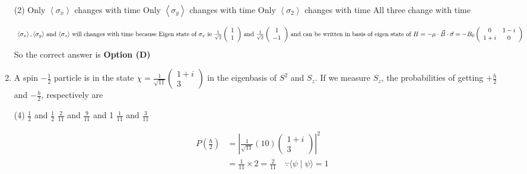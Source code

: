 \begin{enumerate}
{}
\begin{tasks}(2)
\task[\textbf{A.}] Only $\left\langle\sigma_{x}\right\rangle$ changes with time
\task[\textbf{B.}] Only $\left\langle\sigma_{y}\right\rangle$ changes with time
\task[\textbf{C.}] Only $\left\langle\sigma_{2}\right\rangle$ changes with time
\task[\textbf{D.}] All three change with time
\end{tasks}
\begin{answer}
\begin{align*}
\intertext{ $\left\langle\sigma_{x}\right\rangle,\left\langle\sigma_{y}\right\rangle$ and $\left\langle\sigma_{z}\right\rangle$ will changes with time because Eigen state of $\sigma_{x}$ ie $\frac{1}{\sqrt{2}}\left(\begin{array}{l}1 \\ 1\end{array}\right)$ and $\frac{1}{\sqrt{2}}\left(\begin{array}{c}1 \\ -1\end{array}\right)$ and can be written in basis of eigen state of $H=-\mu \cdot \vec{B} \cdot \vec{\sigma}=-B_{0}\left(\begin{array}{cc}0 & 1-i \\ 1+i & 0\end{array}\right)$}
\end{align*}
So the correct answer is \textbf{Option (D)}
\end{answer}	
\item A spin $-\frac{1}{2}$ particle is in the state $\chi=\frac{1}{\sqrt{11}}\left(\begin{array}{c}1+i \\ 3\end{array}\right)$ in the eigenbasis of $S^{2}$ and $S_{z} .$ If we measure $S_{z}$, the probabilities of getting $+\frac{h}{2}$ and $-\frac{h}{2}$, respectively are
{}
\begin{tasks}(4)
\task[\textbf{A.}] $\frac{1}{2}$ and $\frac{1}{2}$
\task[\textbf{B.}] $\frac{2}{11}$ and $\frac{9}{11}$
 and 1
\task[\textbf{D.}] $\frac{1}{11}$ and $\frac{3}{11}$
\end{tasks}
\begin{answer}
\begin{align*}
P\left(\frac{\hbar}{2}\right)&=\left|\frac{1}{\sqrt{11}}(10)\left(\begin{array}{c}1+i \\ 3\end{array}\right)\right|^{2}\\&=\frac{1}{11} \times 2=\frac{2}{11} \quad \because\langle\psi \mid \psi\rangle=1\\

\end{align*}
\end{answer}
\end{enumerate}
